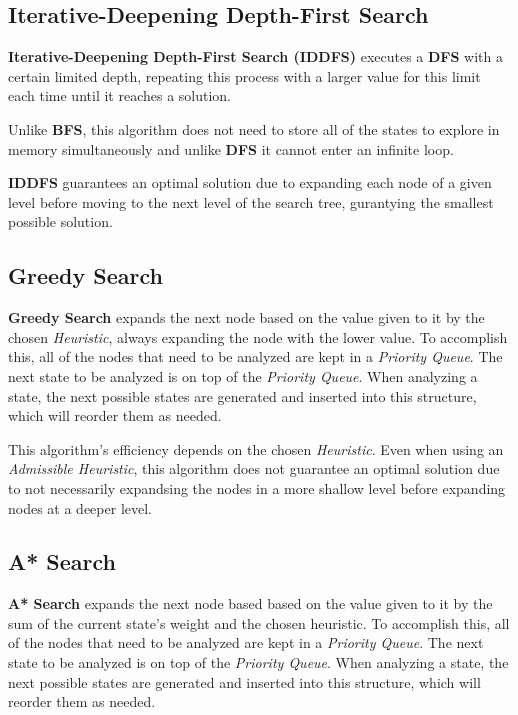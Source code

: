 \documentclass[conference]{IEEEtran}
\begin{document}
\subsection{Iterative-Deepening Depth-First Search}

\textbf{Iterative-Deepening Depth-First Search (IDDFS)} executes a \textbf{DFS} with a certain limited depth, repeating this process with a larger value for this limit each time until it reaches a solution.

Unlike \textbf{BFS}, this algorithm does not need to store all of the states to explore in memory simultaneously and unlike \textbf{DFS} it cannot enter an infinite loop.

\textbf{IDDFS} guarantees an optimal solution due to expanding each node of a given level before moving to the next level of the search tree, gurantying the smallest possible solution.

\subsection{Greedy Search}

\textbf{Greedy Search} expands the next node based on the value given to it by the chosen \textit{Heuristic}, always expanding the node with the lower value. To accomplish this, all of the nodes that need to be analyzed are kept in a \textit{Priority Queue}. The next state to be analyzed is on top of the \textit{Priority Queue}. When analyzing a state, the next possible states are generated and inserted into this structure, which will reorder them as needed.

This algorithm's efficiency depends on the chosen \textit{Heuristic}. Even when using an \textit{Admissible Heuristic}, this algorithm does not guarantee an optimal solution due to not necessarily expandsing the nodes in a more shallow level before expanding nodes at a deeper level.

\subsection{A* Search}

\textbf{A* Search} expands the next node based based on the value given to it by the sum of the current state's weight and the chosen heuristic. To accomplish this, all of the nodes that need to be analyzed are kept in a \textit{Priority Queue}. The next state to be analyzed is on top of the \textit{Priority Queue}. When analyzing a state, the next possible states are generated and inserted into this structure, which will reorder them as needed.
\end{document}
